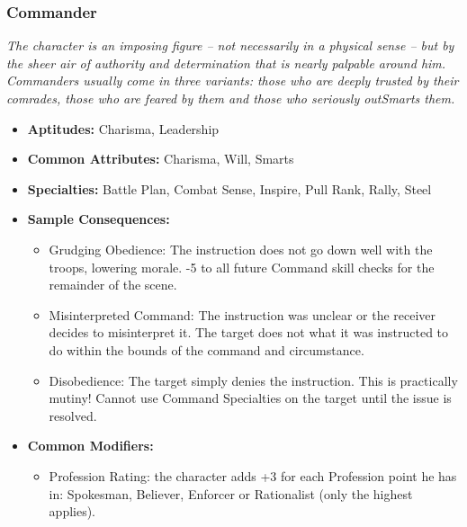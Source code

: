 \subsubsection{Commander}\label{Commander}
\textit{The character is an imposing figure – not necessarily in a physical sense – but by the sheer air of authority and determination that is nearly palpable around him.
Commanders usually come in three variants: those who are deeply trusted by their comrades, those who are feared by them and those who seriously outSmarts them.}
\begin{itemize}
	\item \textbf{Aptitudes:} Charisma, Leadership
	\item \textbf{Common Attributes:} Charisma, Will, Smarts
	\item \textbf{Specialties:} Battle Plan, Combat Sense, Inspire, Pull Rank, Rally, Steel
	\item \textbf{Sample Consequences:} 
	\begin{itemize}
		\item Grudging Obedience: The instruction does not go down well with the troops, lowering morale. -5 to all future Command skill checks for the remainder of the scene.
		\item Misinterpreted Command: The instruction was unclear or the receiver decides to misinterpret it. The target does not what it was instructed to do within the bounds of the command and circumstance.
		\item Disobedience: The target simply denies the instruction. This is practically mutiny! Cannot use Command Specialties on the target until the issue is resolved.
	\end{itemize}
	\item \textbf{Common Modifiers:}
	\begin{itemize}
		\item Profession Rating: the character adds +3 for each Profession point he has in: Spokesman, Believer, Enforcer or Rationalist (only the highest applies).
	\end{itemize}
\end{itemize}

